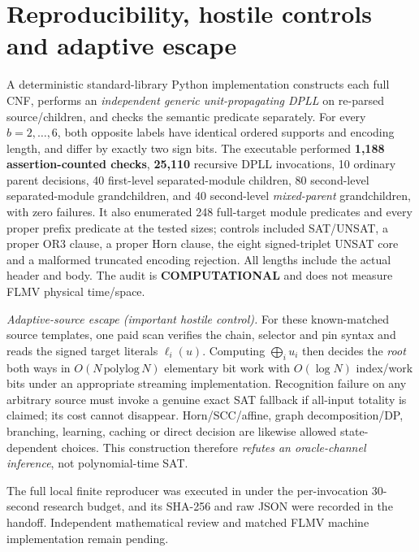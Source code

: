 \documentclass[11pt]{article}
\begin{document}
\section{Reproducibility, hostile controls and adaptive escape}
A deterministic standard-library Python implementation constructs
each full CNF, performs an \emph{independent generic unit-propagating
DPLL} on re-parsed source/children, and checks the semantic predicate
separately. For every $b=2,\ldots,6$, both opposite labels have
identical ordered supports and encoding length, and differ by exactly
two sign bits. The executable performed \textbf{1,188
assertion-counted checks}, \textbf{25,110} recursive DPLL invocations,
10 ordinary parent decisions, 40 first-level separated-module
children, 80 second-level separated-module grandchildren, and 40
second-level \emph{mixed-parent} grandchildren, with zero failures.
It also enumerated 248 full-target module predicates and every proper
prefix predicate at the tested sizes; controls included SAT/UNSAT,
a proper OR3 clause, a proper Horn clause, the eight signed-triplet
UNSAT core and a malformed truncated encoding rejection. All
lengths include the actual header and body. The audit is
\textbf{COMPUTATIONAL} and does not measure FLMV physical time/space.

\emph{Adaptive-source escape (important hostile control).} For these
known-matched source templates, one paid scan verifies the chain,
selector and pin syntax and reads the signed target literals
$\ell_i(u)$. Computing $\bigoplus_i u_i$ then decides the \emph{root}
both ways in $O(N\,\mathrm{polylog}\,N)$ elementary bit work with
$O(\log N)$ index/work bits under an appropriate streaming
implementation. Recognition failure on any arbitrary source must
invoke a genuine exact SAT fallback if all-input totality is claimed;
its cost cannot disappear. Horn/SCC/affine, graph decomposition/DP,
branching, learning, caching or direct decision are likewise allowed
state-dependent choices. This construction therefore \emph{refutes
an oracle-channel inference}, not polynomial-time SAT.

The full local finite reproducer was executed in under the
per-invocation 30-second research budget, and its SHA-256 and raw JSON
were recorded in the handoff. Independent mathematical review and
matched FLMV machine implementation remain pending.
\end{document}
